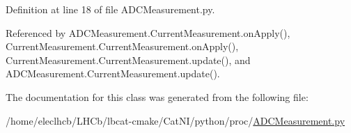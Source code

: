 Definition at line 18 of file A\+D\+C\+Measurement.\+py.



Referenced by A\+D\+C\+Measurement.\+Current\+Measurement.\+on\+Apply(), Current\+Measurement.\+Current\+Measurement.\+on\+Apply(), Current\+Measurement.\+Current\+Measurement.\+update(), and A\+D\+C\+Measurement.\+Current\+Measurement.\+update().



The documentation for this class was generated from the following file\+:\begin{DoxyCompactItemize}
\item 
/home/eleclhcb/\+L\+H\+Cb/lbcat-\/cmake/\+Cat\+N\+I/python/proc/\hyperlink{ADCMeasurement_8py}{A\+D\+C\+Measurement.\+py}\end{DoxyCompactItemize}
